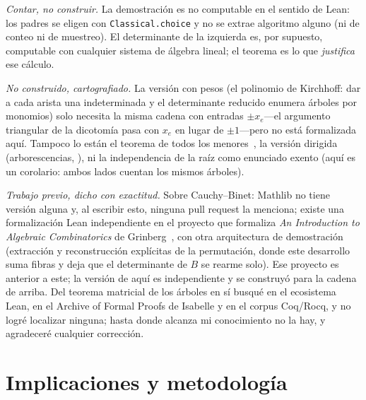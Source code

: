 \documentclass[11pt]{article}
\newcommand{\lean}[1]{\texttt{#1}}
\begin{document}
\emph{Contar, no construir.} La demostraci\'on es no computable en el sentido de Lean: los
padres se eligen con \lean{Classical.choice} y no se extrae algoritmo alguno (ni de conteo ni
de muestreo). El determinante de la izquierda es, por supuesto, computable con cualquier
sistema de \'algebra lineal; el teorema es lo que \emph{justifica} ese c\'alculo.

\emph{No construido, cartografiado.} La versi\'on con pesos (el polinomio de Kirchhoff: dar a
cada arista una indeterminada y el determinante reducido enumera \'arboles por monomios) solo
necesita la misma cadena con entradas $\pm x_e$---el argumento triangular de la dicotom\'ia
pasa con $x_e$ en lugar de $\pm1$---pero no est\'a formalizada aqu\'i. Tampoco lo est\'an el
teorema de todos los menores~\cite{ChaikenKleitman1978}, la versi\'on dirigida (arborescencias,
\cite{Tutte1948}), ni la independencia de la ra\'iz como enunciado exento (aqu\'i es un
corolario: ambos lados cuentan los mismos \'arboles).

\emph{Trabajo previo, dicho con exactitud.} Sobre Cauchy--Binet: Mathlib no tiene versi\'on
alguna y, al escribir esto, ninguna pull request la menciona; existe una formalizaci\'on Lean
independiente en el proyecto que formaliza \emph{An Introduction to Algebraic Combinatorics} de
Grinberg~\cite{Grinberg,FaabianRepo}, con otra arquitectura de demostraci\'on (extracci\'on y
reconstrucci\'on expl\'icitas de la permutaci\'on, donde este desarrollo suma fibras y deja que
el determinante de $B$ se rearme solo). Ese proyecto es anterior a este; la versi\'on de
aqu\'i es independiente y se construy\'o para la cadena de arriba. Del teorema matricial de los
\'arboles en s\'i busqu\'e en el ecosistema Lean, en el Archive of Formal Proofs de Isabelle y
en el corpus Coq/Rocq, y no logr\'e localizar ninguna; hasta donde alcanza mi conocimiento no
la hay, y agradecer\'e cualquier correcci\'on.

\section{Implicaciones y metodolog\'ia}
\label{sec:implications}
\end{document}
